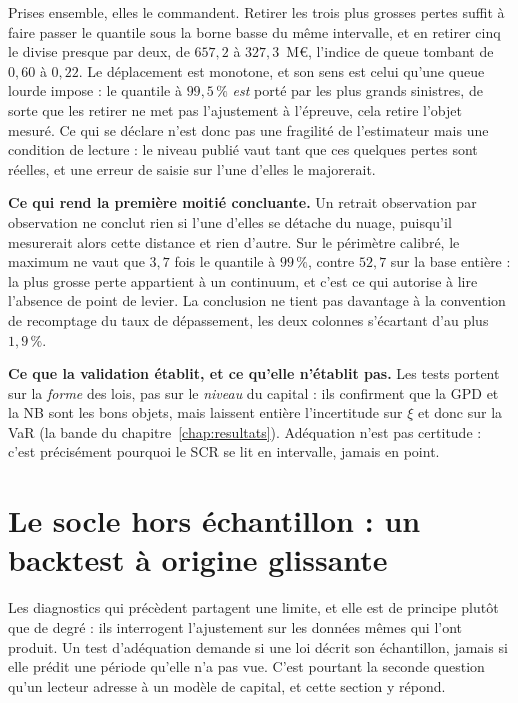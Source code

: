 Prises ensemble, elles le commandent. Retirer les trois plus grosses pertes suffit à faire
passer le quantile sous la borne basse du même intervalle, et en retirer cinq le divise presque
par deux, de $657{,}2$ à $327{,}3$~M\euro, l'indice de queue tombant de $0{,}60$ à $0{,}22$. Le
déplacement est monotone, et son sens est celui qu'une queue lourde impose : le quantile à
$99{,}5\,\%$ \emph{est} porté par les plus grands sinistres, de sorte que les retirer ne met pas
l'ajustement à l'épreuve, cela retire l'objet mesuré. Ce qui se déclare n'est donc pas une
fragilité de l'estimateur mais une condition de lecture : le niveau publié vaut tant que ces
quelques pertes sont réelles, et une erreur de saisie sur l'une d'elles le majorerait.

\begin{attention}
\textbf{Ce qui rend la première moitié concluante.} Un retrait observation par observation ne
conclut rien si l'une d'elles se détache du nuage, puisqu'il mesurerait alors cette distance et
rien d'autre. Sur le périmètre calibré, le maximum ne vaut que $3{,}7$ fois le quantile à
$99\,\%$, contre $52{,}7$ sur la base entière : la plus grosse perte appartient à un continuum,
et c'est ce qui autorise à lire l'absence de point de levier. La conclusion ne tient pas
davantage à la convention de recomptage du taux de dépassement, les deux colonnes s'écartant
d'au plus $1{,}9\,\%$.
\end{attention}

\begin{cle}
\textbf{Ce que la validation établit, et ce qu'elle n'établit pas.} Les tests portent sur la
\emph{forme} des lois, pas sur le \emph{niveau} du capital : ils confirment que la GPD et la
NB sont les bons objets, mais laissent entière l'incertitude sur $\xi$ et donc sur la VaR (la
bande du chapitre~\ref{chap:resultats}). Adéquation n'est pas certitude : c'est précisément
pourquoi le SCR se lit en intervalle, jamais en point.
\end{cle}


\section{Le socle hors échantillon : un backtest à origine glissante}
\label{soc:sec:backtest}

Les diagnostics qui précèdent partagent une limite, et elle est de principe plutôt que de
degré : ils interrogent l'ajustement sur les données mêmes qui l'ont produit. Un test
d'adéquation demande si une loi décrit son échantillon, jamais si elle prédit une période
qu'elle n'a pas vue. C'est pourtant la seconde question qu'un lecteur adresse à un modèle de
capital, et cette section y répond.

